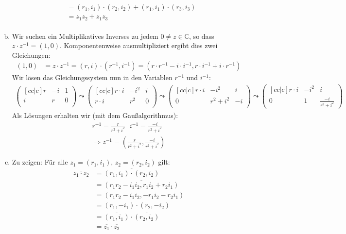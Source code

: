 \documentclass{scrreprt}
\newcommand{\CC}{\mathbb{C}}
\begin{document}
\begin{enumerate}[(a)]
\begin{align*}
        & = (r_1, i_1) \cdot (r_2, i_2) + (r_1, i_1) \cdot (r_3, i_3)\\
        & = z_1 z_2 + z_1 z_3\\
    \end{align*}
\item
    Wir suchen ein Multiplikatives Inverses zu jedem $0 \neq z \in \CC$, so dass $z \cdot z^{-1} = (1,0)$. Komponentenweise ausmultipliziert ergibt dies zwei Gleichungen:
    \begin{align*}
        (1,0) & = z \cdot z^{-1} = (r, i) \cdot (r^{-1}, i^{-1}) = (r  \cdot r^{-1} - i \cdot i^{-1}, r \cdot i^{-1} + i\cdot r^{-1})
    \end{align*}
    Wir lösen das Gleichungssystem nun in den Variablen $r^{-1}$ und $i^{-1}$:
    \begin{align*}
        \begin{pmatrix}[cc|c]
            r & -i & 1\\
            i & r & 0\\
        \end{pmatrix}
        \leadsto
        \begin{pmatrix}[cc|c]
            r \cdot i & -i^2 & i\\
            r \cdot i & r^2 & 0\\
        \end{pmatrix}
        \leadsto
        \begin{pmatrix}[cc|c]
            r \cdot i & -i^2 & i\\
            0 & r^2 + i^2 & -i\\
        \end{pmatrix}
        \leadsto
        \begin{pmatrix}[cc|c]
            r \cdot i & -i^2 & i\\
            0 & 1 & \frac{-i}{r^2 + i^2}
        \end{pmatrix}
    \end{align*}
    Als Lösungen erhalten wir (mit dem Gaußalgorithmus):
    \begin{align*}
        r^{-1} = \frac{r}{r^2 + i^2} ~~~ i^{-1} = \frac{-i}{r^2 + i^2}\\
        \Rightarrow z^{-1} = \left(\frac{r}{r^2 + i^2},\frac{-i}{r^2 + i^2}\right)
    \end{align*}
\item
    Zu zeigen: Für alle $z_1 = (r_1, i_1)$, $z_2 = (r_2, i_2)$ gilt: 
    \begin{align*}
        \overline{z_1 \cdot z_2} & = \overline{(r_1, i_1) \cdot (r_2, i_2)}\\
        & = \overline{(r_1 r_2 - i_1 i_2, r_1 i_2 + r_2 i_1)}\\
        & = (r_1 r_2 - i_1 i_2, - r_1 i_2 - r_2 i_1)\\
        & = (r_1, -i_1) \cdot (r_2, -i_2)\\
        & = \overline{(r_1, i_1)} \cdot \overline{(r_2, i_2)}\\
        & = \overline{z_1} \cdot \overline{z_2}
    \end{align*}
\end{enumerate}
\end{document}
